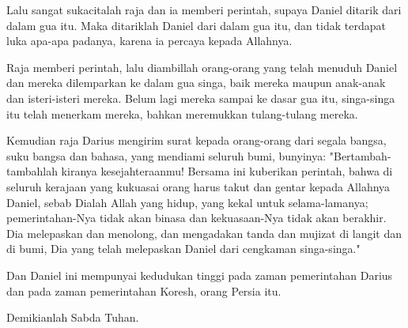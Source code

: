 {Lalu sangat sukacitalah raja dan ia memberi perintah, supaya Daniel ditarik dari dalam gua itu. Maka ditariklah Daniel dari dalam gua itu, dan tidak terdapat luka apa-apa padanya, karena ia percaya kepada Allahnya.

Raja memberi perintah, lalu diambillah orang-orang yang telah menuduh Daniel dan mereka dilemparkan ke dalam gua singa, baik mereka maupun anak-anak dan isteri-isteri mereka. Belum lagi mereka sampai ke dasar gua itu, singa-singa itu telah menerkam mereka, bahkan meremukkan tulang-tulang mereka.

Kemudian raja Darius mengirim surat kepada orang-orang dari segala bangsa, suku bangsa dan bahasa, yang mendiami seluruh bumi, bunyinya: "Bertambah-tambahlah kiranya kesejahteraanmu!
Bersama ini kuberikan perintah, bahwa di seluruh kerajaan yang kukuasai orang harus takut dan gentar kepada Allahnya Daniel, sebab Dialah Allah yang hidup, yang kekal untuk selama-lamanya; pemerintahan-Nya tidak akan binasa dan kekuasaan-Nya tidak akan berakhir.
Dia melepaskan dan menolong, dan mengadakan tanda dan mujizat di langit dan di bumi, Dia yang telah melepaskan Daniel dari cengkaman singa-singa."

Dan Daniel ini mempunyai kedudukan tinggi pada zaman pemerintahan Darius dan pada zaman pemerintahan Koresh, orang Persia itu.

Demikianlah Sabda Tuhan.}


 

 






